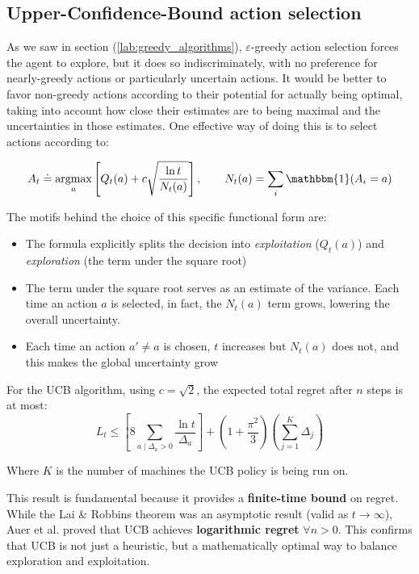 \subsection{Upper-Confidence-Bound action selection}
As we saw in section (\ref{lab:greedy_algorithms}), $\varepsilon$-greedy action selection forces the agent to explore, but it does so indiscriminately, with no preference for nearly-greedy actions or particularly uncertain actions. It would be better to favor non-greedy actions according to their potential for actually being optimal, taking into account how close their estimates are to being maximal and the uncertainties in those estimates. One effective way of doing this is to select actions according to:

\[
    A_t \doteq \argmax_{a} \left[ Q_t(a) + c \sqrt{\frac{\ln t}{N_t(a)}}\right], \qquad N_t(a)=\sum_i \mathbbm{1}(A_i=a)
\]

\noindent
The motifs behind the choice of this specific functional form are:
\begin{itemize}
    \item The formula explicitly splits the decision into \textit{exploitation} ($Q_t(a)$) and \textit{exploration} (the term under the square root)
    \item The term under the square root serves as an estimate of the variance. Each time an action $a$ is selected, in fact, the $N_t(a)$ term grows, lowering the overall uncertainty.
    \item Each time an action $a' \neq a$ is chosen, $t$ increases but $N_t(a)$ does not, and this makes the global uncertainty grow 
\end{itemize}

\begin{theorem}
    For the UCB algorithm, using $c=\sqrt{2}$, the expected total regret after $n$ steps is at most:
    \[
        L_t \leq \left[ 8 \sum_{a \mid \Delta_a > 0} \frac{\ln t}{\Delta_a} \right] + \left( 1 + \frac{\pi^2}{3}\right) \left( \sum_{j=1}^{K} \Delta_j \right)
     \]
\end{theorem}

Where $K$ is the number of machines the UCB policy is being run on.

This result is fundamental because it provides a \textbf{finite-time bound} on regret. While the Lai \& Robbins theorem was an asymptotic result (valid as $t \to \infty$), Auer et al. proved that UCB achieves \textbf{logarithmic regret} $\forall n > 0$. This confirms that UCB is not just a heuristic, but a mathematically optimal way to balance exploration and exploitation.